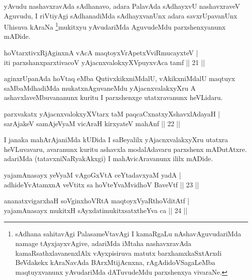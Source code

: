 \begin{artha}
yAvudu nashavxravAda sAdhanavo, adara PalavAda sAdhayxvU nashavxraveV Aguvudu, I riVtiyAgi sAdhanadiMda sAdhayxvanUnx adara savxrUpavanUnx Uhisuva kAraNa \footnote{sAdhana sahitavAgi PalasameVtavAgi I kamaRgaLu nAshavAguvudariMda namage tAyxjayxvAgive, adariMda iMtaha nashavxravAda kamaRsathxlavanenxlAlx vAyxpisiruva matutx barxhamxkaSxtArxdi BeVdakekx kAraNavAda BArxMtijAcnxna, rAgAdidoVSagaLeMba maqtuyxvanunx yAvudariMda dATuvudeMdu parxshenxya vivaraNe.}mukitxyu yAvudariMda AguvudeMdu parxshenxyanunx mADide.
\end{artha}


\begin{shl}
hoVtarxtivxRjA\s ginxnA vAcA maqtoyxVrApetxVviRmucayxteV |\\
iti parxshanxparxtivacoV yAjacnxvalokxyXV\s puyxvAca tamf \hfill || 21 ||
\end{shl}

\begin{artha}
aginxrUpanAda hoVtaq eMba QutivxkikxniMdalU, vAkikxniMdalU maqtuyx saMbaMdhadiMda mukatxnAguvaneMdu yAjacnxvalakxyXru A ashavxlaveMbuvananunx kuritu I parxshenxge utatxravanunx heVLidaru.
\end{artha}

\begin{shl}
parxvakatx yAjacnxvalokxyXV\s tarx taM paqcaCxnatxyXshavxlAdayaH |\\
sarAjakeV samAjeV\s yaM vicAraH kirxyateV mahAnf \hfill || 22 ||
\end{shl}

\begin{artha}
I janaka mahArAjaniMda kUDida I saBeyalilx yAjacnxvalakxyXru utatxra heVLuvavaru, avaranunx kuritu ashavxla modalAdavaru parxshenx mADutAtxre. adariMda (tatavxniNaRyakAkxgi) I mahAvicAravanunx ililx mADide.
\end{artha}


\begin{shl}
yajamAnasayx yeVyaM vAgoGxVtA ceYtadavxyaM yadA |\\
adhideYvAtamxnA veVtitx sa hoVteYvaMvidhoV BaveVtf \hfill || 23 ||
\end{shl}

\begin{shl}
ananatxvigarxhaH soV\s ginxhoVRtA maqtoyxVyaRthoVditAtf |\\
yajamAnasayx mukitxH sAyxdatimukitxsatxtheYva ca \hfill || 24 ||
\end{shl}

